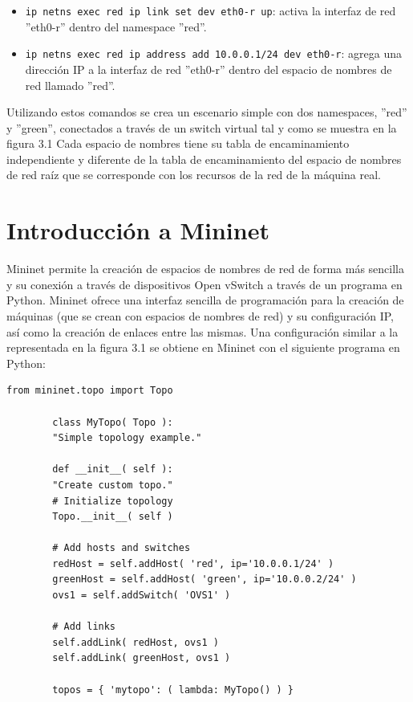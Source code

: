 \documentclass[a4paper, 12pt]{book}
\begin{document}
\begin{itemize}
		\item \verb*|ip netns exec red ip link set dev eth0-r up|: activa la interfaz de red ''eth0-r'' dentro del namespace ''red''.
		
		\item \verb*|ip netns exec red ip address add 10.0.0.1/24 dev eth0-r|: agrega una dirección IP a la interfaz de red ''eth0-r'' dentro del espacio de nombres de red llamado ''red''.
		
		
		
		
		
		
	
	\end{itemize}
	
	Utilizando estos comandos se crea un escenario simple con dos namespaces, ''red'' y ''green'', conectados a través de un switch virtual tal y como se muestra en la figura 3.1 Cada espacio de nombres tiene su tabla de encaminamiento independiente y diferente de la tabla de encaminamiento del espacio de nombres de red raíz que se corresponde con los recursos de la red de la máquina real.
	

	
	
	\section{Introducción a Mininet}
	
	Mininet permite la creación de espacios de nombres de red de forma más sencilla y su conexión a través
	de dispositivos Open vSwitch a través de un programa en Python. Mininet ofrece una interfaz sencilla
	de programación para la creación de máquinas (que se crean con espacios de nombres de red) y su
	configuración IP, así como la creación de enlaces entre las mismas.
	Una configuración similar a la representada en la figura 3.1 se obtiene en Mininet con el siguiente
	programa en Python:
	
	 \begin{lstlisting}[caption={Ejemplo de topología simple en Mininet}, label={lst:mytopo}]
	 	from mininet.topo import Topo
	 	
	 	class MyTopo( Topo ):
	 	"Simple topology example."
	 	
	 	def __init__( self ):
	 	"Create custom topo."
	 	# Initialize topology
	 	Topo.__init__( self )
	 	
	 	# Add hosts and switches
	 	redHost = self.addHost( 'red', ip='10.0.0.1/24' )
	 	greenHost = self.addHost( 'green', ip='10.0.0.2/24' )
	 	ovs1 = self.addSwitch( 'OVS1' )
	 	
	 	# Add links
	 	self.addLink( redHost, ovs1 )
	 	self.addLink( greenHost, ovs1 )
	 	
	 	topos = { 'mytopo': ( lambda: MyTopo() ) }
	 \end{lstlisting}
	
\end{document}
